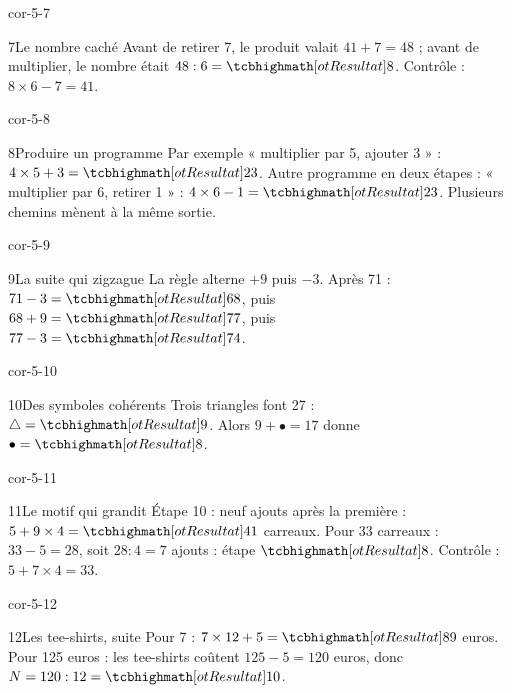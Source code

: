 \begin{blocLivre}{cor-5-7}\begin{corrige}{7}{Le nombre caché}
Avant de retirer 7, le produit valait $41+7=48$ ; avant de multiplier, le nombre était $48:6=\res8$. Contrôle : $8\times6-7=41$.
\end{corrige}\end{blocLivre}
\begin{blocLivre}{cor-5-8}\begin{corrige}{8}{Produire un programme}
Par exemple « multiplier par 5, ajouter 3 » : $4\times5+3=\res{23}$. Autre programme en deux étapes : « multiplier par 6, retirer 1 » : $4\times6-1=\res{23}$. Plusieurs chemins mènent à la même sortie.
\end{corrige}\end{blocLivre}
\begin{blocLivre}{cor-5-9}\begin{corrige}{9}{La suite qui zigzague}
La règle alterne $+9$ puis $-3$. Après 71 : $71-3=\res{68}$, puis $68+9=\res{77}$, puis $77-3=\res{74}$.
\end{corrige}\end{blocLivre}
\begin{blocLivre}{cor-5-10}\begin{corrige}{10}{Des symboles cohérents}
Trois triangles font 27 : $\triangle=\res9$. Alors $9+\bullet=17$ donne $\bullet=\res8$.
\end{corrige}\end{blocLivre}
\begin{blocLivre}{cor-5-11}\begin{corrige}{11}{Le motif qui grandit}
Étape 10 : neuf ajouts après la première : $5+9\times4=\res{41}$ carreaux. Pour 33 carreaux : $33-5=28$, soit $28:4=7$ ajouts : étape $\res8$. Contrôle : $5+7\times4=33$.
\label{fig-cor-5-11}
\end{corrige}\end{blocLivre}
\begin{blocLivre}{cor-5-12}\begin{corrige}{12}{Les tee-shirts, suite}
Pour 7 : $7\times12+5=\res{89}$ euros. Pour 125 euros : les tee-shirts coûtent $125-5=120$ euros, donc $N=120:12=\res{10}$.
\end{corrige}\end{blocLivre}
